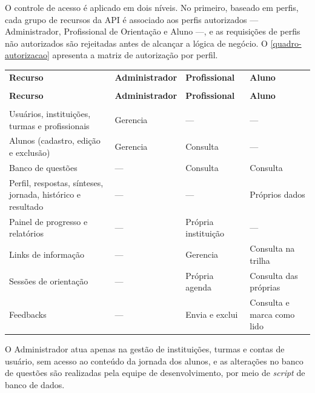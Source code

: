 O controle de acesso é aplicado em dois níveis. No primeiro, baseado em perfis, cada grupo de recursos da API é associado aos perfis autorizados — Administrador, Profissional de Orientação e Aluno —, e as requisições de perfis não autorizados são rejeitadas antes de alcançar a lógica de negócio. O \autoref{quadro-autorizacao} apresenta a matriz de autorização por perfil.

{\ABNTEXfontereduzida
\renewcommand{\arraystretch}{1.25}
\begin{xltabular}{\textwidth}{|>{\raggedright\arraybackslash}X|>{\raggedright\arraybackslash}p{2.8cm}|>{\raggedright\arraybackslash}p{2.8cm}|>{\raggedright\arraybackslash}p{2.7cm}|}
 \\[0.3em]
\hline
\textbf{Recurso} & \textbf{Administrador} & \textbf{Profissional} & \textbf{Aluno} \\
\hline
\endfirsthead
{} \\
\hline
\textbf{Recurso} & \textbf{Administrador} & \textbf{Profissional} & \textbf{Aluno} \\
\hline
\endhead
{} \\
\endfoot
\endlastfoot
Usuários, instituições, turmas e profissionais & Gerencia & — & — \\
\hline
Alunos (cadastro, edição e exclusão) & Gerencia & Consulta & — \\
\hline
Banco de questões & — & Consulta & Consulta \\
\hline
Perfil, respostas, sínteses, jornada, histórico e resultado & — & — & Próprios dados \\
\hline
Painel de progresso e relatórios & — & Própria instituição & — \\
\hline
Links de informação & — & Gerencia & Consulta na trilha \\
\hline
Sessões de orientação & — & Própria agenda & Consulta das próprias \\
\hline
Feedbacks & — & Envia e exclui & Consulta e marca como lido \\
\hline
\end{xltabular}
}

O Administrador atua apenas na gestão de instituições, turmas e contas de usuário, sem acesso ao conteúdo da jornada dos alunos, e as alterações no banco de questões são realizadas pela equipe de desenvolvimento, por meio de \textit{script} de banco de dados.

